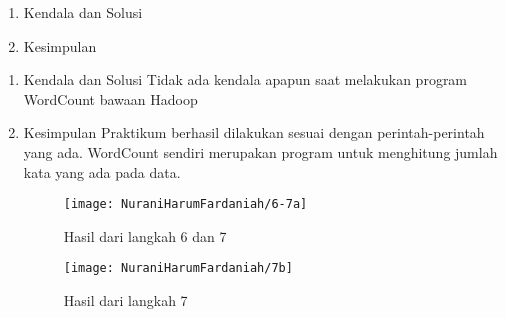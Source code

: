 \begin{enumerate}
\item Kendala dan Solusi

\item Kesimpulan

\end{enumerate}

\begin{enumerate}
\item Kendala dan Solusi
\newline Tidak ada kendala apapun saat melakukan program WordCount bawaan Hadoop

\item Kesimpulan
\newline Praktikum berhasil dilakukan sesuai dengan perintah-perintah yang ada. WordCount sendiri merupakan program untuk menghitung jumlah kata yang ada pada data.


\begin{figure}[!ht]
\texttt{[image: NuraniHarumFardaniah/6-7a]}
\caption{Hasil dari langkah 6 dan 7}
\label{gam:perkuliahan-25-11}
\end{figure}
\newpage
\begin{figure}[!ht]
\texttt{[image: NuraniHarumFardaniah/7b]}
\caption{Hasil dari langkah 7}
\label{gam:perkuliahan-25-11}
\end{figure}

\end{enumerate}

